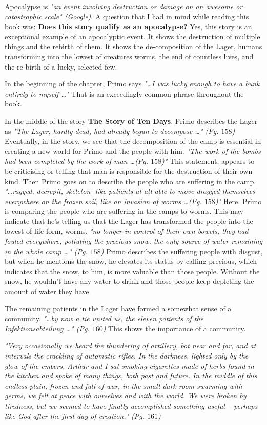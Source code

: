 Apocalypse is \textit{"an event involving destruction or damage on an awesome or
catastrophic scale" (Google)}. A question that I had in mind while reading this
book was: \textbf{Does this story qualify as an apocalypse?} Yes, this story is
an exceptional example of an apocalyptic event. It shows the destruction of
multiple things and the rebirth of them. It shows the de-composition of the
Lager, humans transforming into the lowest of creatures worms, the end of
countless lives, and the re-birth of a lucky, selected few.

In the beginning of the chapter, Primo says \textit{"\ldots I was lucky enough
to have a bunk entirely to myself \ldots"} That is an exceedingly common phrase
throughout the book.

In the middle of the story \textbf{The Story of Ten Days}, Primo describes the
Lager as \textit{"The Lager, hardly dead, had already begun to decompose \ldots"
(Pg. $158$)} Eventually, in the story, we see that the decomposition of the camp
is essential in creating a new world for Primo and the people with him.
\textit{"The work of the bombs had been completed by the work of man \ldots (Pg.
$158$)"} This statement, appears to be criticising or telling that man is
responsible for the destruction of their own kind. Then Primo goes on to
describe the people who are suffering in the camp. \textit{"\ldots ragged,
decrepit, skeleton- like patients at all able to move dragged themselves
everywhere on the frozen soil, like an invasion of worms \ldots (Pg. $158$)"}
Here, Primo is comparing the people who are suffering in the camps to worms.
This may indicate that he's telling us that the Lager has transformed the people
into the lowest of life form, worms. \textit{"no longer in control of their own
bowels, they had fouled everywhere, polluting the precious snow, the only source
of water remaining in the whole camp \ldots" (Pg. $158$)} Primo describes the
suffering people with disgust, but when he mentions the snow, he elevates its
status by calling precious, which indicates that the snow, to him, is more
valuable than those people. Without the snow, he wouldn't have any water to
drink and those people keep depleting the amount of water they have.

The remaining patients in the Lager have formed a somewhat sense of a community.
\textit{"\ldots by now a tie united us, the eleven patients of the
Infektionsabteilung \ldots" (Pg. $160$)} This shows the importance of a
community. 

\textit{"Very occasionally we heard the thundering of artillery, bot near and
far, and at intervals the crackling of automatic rifles. In the darkness,
lighted only by the glow of the embers, Arthur and I sat smoking cigarettes made
of herbs found in the kitchen and spoke of many things, both past and future. In
the middle of this endless plain, frozen and full of war, in the small dark room
swarming with germs, we felt at peace with ourselves and with the world. We were
broken by tiredness, but we seemed to have finally accomplished something useful
-- perhaps like God after the first day of creation." (Pg. $161$)}

